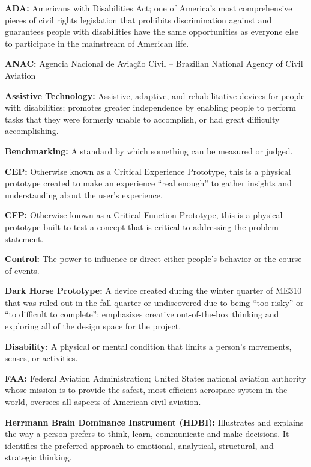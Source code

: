   \item  \textbf{ADA:} Americans with Disabilities Act; one of America's most comprehensive pieces of civil rights legislation that prohibits discrimination against and guarantees people with disabilities have the same opportunities as everyone else to participate in the mainstream of American life.
  \item \textbf{ANAC:} Agencia Nacional de Aviação Civil – Brazilian National Agency of Civil Aviation
  \item  \textbf{Assistive Technology:} Assistive, adaptive, and rehabilitative devices for people with disabilities; promotes greater independence by enabling people to perform tasks that they were formerly unable to accomplish, or had great difficulty accomplishing.
  \item  \textbf{Benchmarking:} A standard by which something can be measured or judged.
  \item  \textbf{CEP:} Otherwise known as a Critical Experience Prototype, this is a physical prototype created to make an experience “real enough” to gather insights and understanding about the user’s experience.
  \item  \textbf{CFP:} Otherwise known as a Critical Function Prototype, this is a physical prototype built to test a concept that is critical to addressing the problem statement.
  \item \textbf{Control:} The power to influence or direct either people's behavior or the course of events.
  \item \textbf{Dark Horse Prototype:} A device created during the winter quarter of ME310 that was ruled out in the fall quarter or undiscovered due to being “too risky” or “to difficult to complete”; emphasizes creative out-of-the-box thinking and exploring all of the design space for the project. 
  \item \textbf{Disability:} A physical or mental condition that limits a person's movements, senses, or activities.
  \item \textbf{FAA:} Federal Aviation Administration; United States national aviation authority whose mission is to provide the safest, most efficient aerospace system in the world, oversees all aspects of American civil aviation.
  \item \textbf{Herrmann Brain Dominance Instrument (HDBI):} Illustrates and explains the way a person prefers to think, learn, communicate and make decisions. It identifies the preferred approach to emotional, analytical, structural, and strategic thinking.
